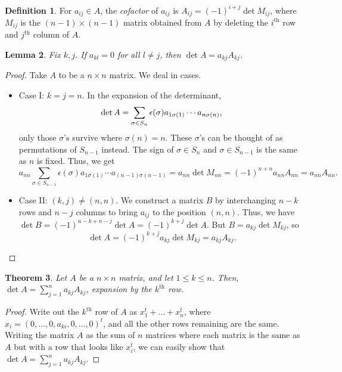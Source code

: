 \documentclass[15pt,a4paper]{book}
\newtheorem{theorem}{Theorem}[chapter]
\newtheorem{lemma}[theorem]{Lemma}
\theoremstyle{definition}
\newtheorem{definition}[theorem]{Definition}
\newcommand{\eax}[1]{\emph{#1}\index{#1}} %
\begin{document}
\begin{definition}
    For $a_{ij} \in A$, the \eax{cofactor} of $a_{ij}$ is $A_{ij}=(-1)^{i+j} \det M_{ij}$, where $M_{ij}$ is the $(n-1) \times (n-1)$ matrix obtained from $A$ by deleting the $i^{\text{th}}$ row and $j^{\text{th}}$ column of $A$.
\end{definition}
\begin{lemma}
    Fix $k,j$. If $a_{kl} = 0$ for all $l \neq j$, then $\det{A} = a_{kj}A_{kj}$.
\end{lemma}
\begin{proof}
    Take $A$ to be a $n \times n$ matrix. We deal in cases.
    \begin{itemize}
        \item Case I: $k=j=n$. In the expansion of the determinant,
        \begin{equation}
            \det{A} = \sum_{\sigma \in S_{n}} \epsilon(\sigma) a_{1 \sigma(1)} \cdots a_{n \sigma(n)}, \notag
        \end{equation}
        only those $\sigma$'s survive where $\sigma(n) = n$. These $\sigma$'s can be thought of as permutations of $S_{n-1}$ instead. The sign of $\sigma \in S_{n}$ and $\sigma \in S_{n-1}$ is the same as $n$ is fixed. Thus, we get
        \begin{equation}
            a_{nn} \sum_{\sigma \in S_{n-1}} \epsilon(\sigma) a_{1 \sigma(1)} \cdots a_{(n-1) \sigma(n-1)} = a_{nn} \det M_{nn} = (-1)^{n+n} a_{nn} A_{nn} = a_{nn} A_{nn}.
        \end{equation}
        \item Case II: $(k,j) \neq (n,n)$. We construct a matrix $B$ by interchanging $n-k$ rows and $n-j$ columns to bring $a_{ij}$ to the position $(n,n)$. Thus, we have $\det B = (-1)^{n-k+n-j} \det A = (-1)^{k+j} \det A$. But $B = a_{kj} \det M_{kj}$, so
        \begin{equation}
            \det A = (-1)^{k+j} a_{kj} \det M_{kj} = a_{kj} A_{kj}.
        \end{equation}
    \end{itemize}
\end{proof}
\begin{theorem}
    Let $A$ be a $n \times n$ matrix, and let $1 \leq k \leq n$. Then, $\det {A} = \sum \limits_{j=1}^{n} a_{kj} A_{kj}$, expansion by the $k^{\text{th}}$ row.
\end{theorem}
\begin{proof}
    Write out the $k^{\text{th}}$ row of $A$ as $x_{1}^{t}+\ldots+x_{n}^{t}$, where $x_{i} = (0,\ldots,0,a_{ki},0,\ldots,0)^{t}$, and all the other rows remaining are the same. Writing the matrix $A$ as the sum of $n$ matrices where each matrix is the same as $A$ but with a row that looks like $x_{i}^{t}$, we can easily show that $\det{A} = \sum_{j=1}^{n} a_{kj} A_{kj}$.
\end{proof}
\end{document}
